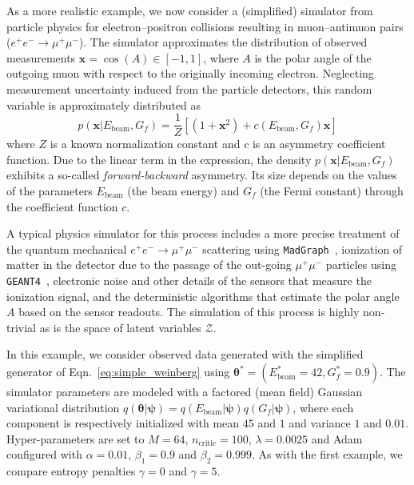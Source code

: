 \documentclass[twocolumn,superscriptaddress,aps]{revtex4-1}
\newcommand{\bftheta}{{\bm \theta}}
\newcommand{\bfpsi}{{\bm \psi}}
\newcommand{\bfz}{\mathbf{z}}
\theoremstyle{plain}
\begin{document}
As a more realistic example, we now consider a (simplified) simulator from
particle physics for electron--positron collisions resulting in muon--antimuon
pairs ($e^+e^- \rightarrow \mu^+\mu^-$). The simulator approximates the
distribution of observed measurements $\mathbf{x} = \cos(A) \in [-1,1]$, where $A$ is the
polar angle of the outgoing muon with respect  to the originally incoming
electron. Neglecting measurement uncertainty induced from the particle detectors,
this random variable is approximately distributed as
\begin{equation}\label{eq:simple_weinberg}
    p(\mathbf{x}|E_\text{beam}, G_f) = \frac{1}{Z} \left[ (1 + \mathbf{x}^2) + c(E_\text{beam}, G_f) \mathbf{x} \right]
\end{equation}
where $Z$ is a known normalization constant and $c$ is an asymmetry coefficient
function. Due to the linear term in the expression, the density $p(\mathbf{x} |
E_\text{beam}, G_f)$ exhibits a so-called {\it forward-backward} asymmetry.  Its
size depends on the values of the parameters $E_\text{beam}$ (the beam energy)
and $G_f$ (the Fermi constant) through the coefficient function $c$.

A typical physics simulator for this process includes a more precise treatment of the
quantum mechanical  $e^+e^- \rightarrow \mu^+\mu^-$ scattering
using \texttt{MadGraph}~\citep{Alwall:2011uj},  ionization of matter in the
detector due to the passage of the out-going $\mu^+\mu^-$ particles using
\texttt{GEANT4}~\citep{Agostinelli:2002hh}, electronic noise and other details of the sensors
that measure the ionization signal, and the deterministic algorithms that
estimate the polar angle $A$ based on the sensor readouts. The simulation of
this process is highly non-trivial as is the space of latent variables $\mathcal{Z}$.



In this example, we consider observed data generated with the simplified generator of Eqn.~\ref{eq:simple_weinberg}
using $\bftheta^* = (E_\text{beam}^*=42, G_f^*=0.9)$. The simulator parameters are modeled with a
factored (mean field) Gaussian variational distribution $q(\bftheta|\bfpsi) = q(E_\text{beam}|\bfpsi)
q(G_f|\bfpsi)$, where each component is respectively initialized with mean $45$
and $1$ and variance $1$ and $0.01$. Hyper-parameters are set to $M=64$,
$n_\text{critic}=100$, $\lambda=0.0025$ and Adam configured with $\alpha=0.01$,
$\beta_1=0.9$ and $\beta_2=0.999$. As with the first example, we compare
entropy penalties $\gamma=0$ and $\gamma=5$.
\end{document}
